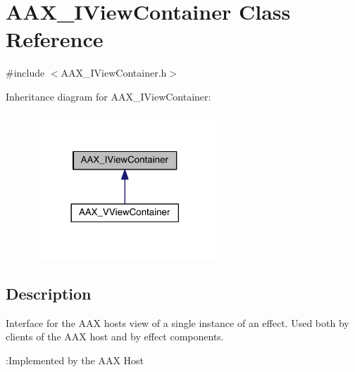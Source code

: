 \hypertarget{a00117}{}\section{A\+A\+X\+\_\+\+I\+View\+Container Class Reference}
\label{a00117}


{\ttfamily \#include $<$A\+A\+X\+\_\+\+I\+View\+Container.\+h$>$}



Inheritance diagram for A\+A\+X\+\_\+\+I\+View\+Container\+:
\nopagebreak
\begin{figure}[H]
\begin{center}
\leavevmode
\includegraphics[width=194pt]{a00668}
\end{center}
\end{figure}


\subsection{Description}
Interface for the A\+A\+X host\textquotesingle{}s view of a single instance of an effect. Used both by clients of the A\+A\+X host and by effect components. 

\begin{DoxyRefDesc}{\+:\+Implemented by the A\+A\+X Host}
\item[\hyperlink{a00001__aax_host_implementation000013}{\+:\+Implemented by the A\+A\+X Host}]\end{DoxyRefDesc}
